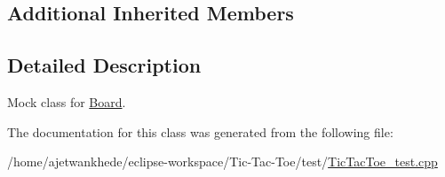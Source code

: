 \subsection*{Additional Inherited Members}


\subsection{Detailed Description}
Mock class for \mbox{\hyperlink{classBoard}{Board}}. 

The documentation for this class was generated from the following file\+:\begin{DoxyCompactItemize}
\item 
/home/ajetwankhede/eclipse-\/workspace/\+Tic-\/\+Tac-\/\+Toe/test/\mbox{\hyperlink{TicTacToe__test_8cpp}{Tic\+Tac\+Toe\+\_\+test.\+cpp}}\end{DoxyCompactItemize}
